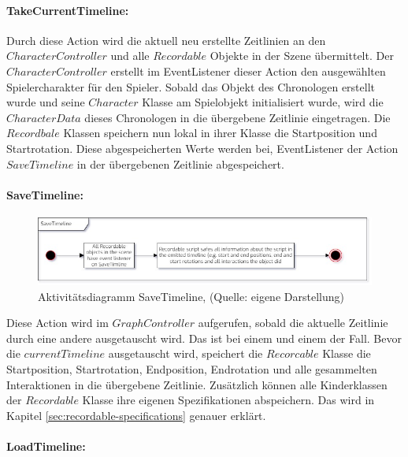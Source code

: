 \paragraph{TakeCurrentTimeline:}
Durch diese Action wird die aktuell neu erstellte Zeitlinien an den $CharacterController$ und alle $Recordable$ Objekte in der Szene übermittelt. Der $CharacterController$ erstellt im EventListener dieser Action den ausgewählten Spielercharakter für den Spieler. Sobald das Objekt des Chronologen erstellt wurde und seine $Character$ Klasse am Spielobjekt initialisiert wurde, wird die $CharacterData$ dieses Chronologen in die übergebene Zeitlinie eingetragen. 
Die $Recordbale$ Klassen speichern nun lokal in ihrer Klasse die Startposition und Startrotation. Diese abgespeicherten Werte werden bei, EventListener der Action $SaveTimeline$ in der übergebenen Zeitlinie abgespeichert.

\paragraph{SaveTimeline:}

\begin{figure}[ht]
\centering
\includegraphics[width=1\linewidth]{content/pictures/SaveTImeline_uml.jpg}
\caption{Aktivitätsdiagramm SaveTimeline, (Quelle: eigene Darstellung)}
\label{fig:save_timeline-cs}
\end{figure}

Diese Action wird im $GraphController$ aufgerufen, sobald die aktuelle Zeitlinie durch eine andere ausgetauscht wird. Das ist bei einem  und einem  der Fall. Bevor die $currentTimeline$ ausgetauscht wird, speichert die $Recorcable$ Klasse die Startposition, Startrotation, Endposition, Endrotation und alle gesammelten Interaktionen in die übergebene Zeitlinie. Zusätzlich können alle Kinderklassen der $Recordable$ Klasse ihre eigenen Spezifikationen abspeichern. Das wird in Kapitel \ref{sec:recordable-specifications} genauer erklärt.

\paragraph{LoadTimeline:}

